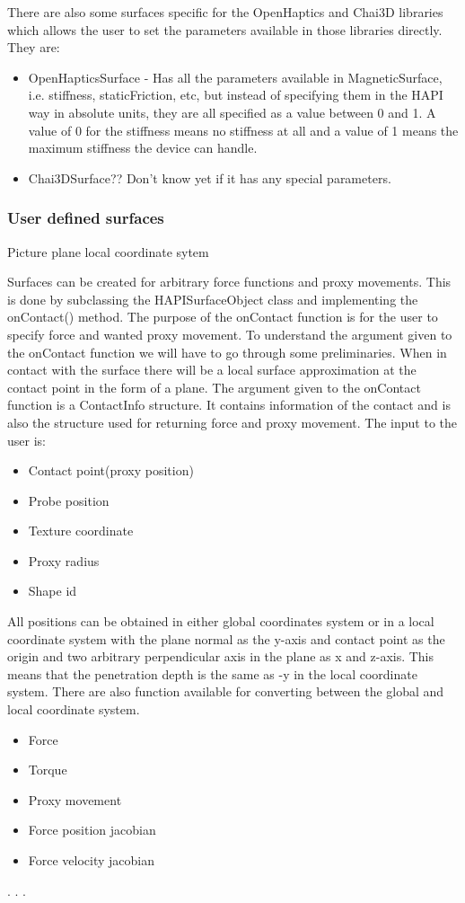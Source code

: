 There are also some surfaces specific for the OpenHaptics and Chai3D
libraries which allows the user to set the parameters available in
those libraries directly. They are:
\begin{itemize}
\item OpenHapticsSurface - Has all the parameters available in
  MagneticSurface, i.e. stiffness, staticFriction, etc, but instead of
  specifying them in the HAPI way in absolute units, they are all
  specified as a value between 0 and 1. A value of 0 for the stiffness
  means no stiffness at all and a value of 1 means the maximum
  stiffness the device can handle.
\item Chai3DSurface?? Don't know yet if it has any special parameters.
\end{itemize}

\subsubsection{User defined surfaces}

Picture plane local coordinate sytem

Surfaces can be created for arbitrary force functions and proxy
movements. This is done by subclassing the HAPISurfaceObject class and
implementing the onContact() method. The purpose of the onContact
function is for the user to specify force and wanted proxy
movement. To understand the argument given to the onContact function
we will have to go through some preliminaries. When in contact with
the surface there will be a local surface approximation at the contact
point in the form of a plane. The argument given to the onContact
function is a ContactInfo structure. It contains information of the
contact and is also the structure used for returning force and proxy
movement. The input to the user is:


\begin{itemize}
\item Contact point(proxy position)
\item Probe position
\item Texture coordinate
\item Proxy radius
\item Shape id
\end{itemize}

All positions can be obtained in either global coordinates system or
in a local coordinate system with the plane normal as the y-axis and
contact point as the origin and two arbitrary perpendicular axis in
the plane as x and z-axis. This means that the penetration depth is
the same as -y in the local coordinate system. There are also function
available for converting between the global and local coordinate
system.

\begin{itemize}
\item Force
\item Torque
\item Proxy movement
\item Force position jacobian
\item Force velocity jacobian

\end{itemize}

.
.
.


